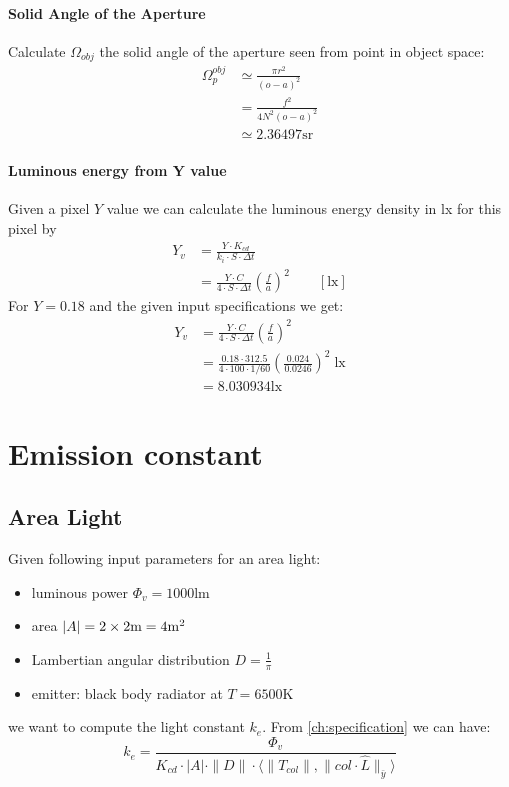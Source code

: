 \fi

\paragraph{Solid Angle of the Aperture}
Calculate $\Omega_{obj}$ the solid angle of the aperture seen from point in object space:
\begin{align*}
\Omega_p^{obj} &\simeq \frac{\pi r^2}{(o-a)^2}\\
&= \frac{f^2}{4N^2(o-a)^2}\\
&\simeq  \num{2.36497}\unit{\steradian}
\end{align*}

\paragraph{Luminous energy from Y value}

Given a pixel $Y$ value we can calculate the luminous energy density in \unit{\lux} for this pixel by
\begin{align*}
Y_v &= \frac{Y\cdot K_{cd}}{ k_i\cdot S \cdot \Delta t} \\
&= \frac{Y\cdot C}{ 4\cdot S \cdot \Delta t} \left(\frac{f}{a}\right)^2
\qquad [\unit{\lux}]
\end{align*}
For $Y=0.18$ and the given input specifications we get:
\begin{align*}
Y_v &= \frac{Y\cdot C}{ 4\cdot S \cdot \Delta t} \left(\frac{f}{a}\right)^2 \\
&= \frac{0.18\cdot 312.5}{ 4\cdot 100 \cdot 1/60} \left(\frac{0.024}{0.0246}\right)^2 \;\unit{\lux} \\
&= \num{8.030934}\unit{\lux}
\end{align*}

\section{Emission constant}

\subsection{Area Light}
Given following input parameters for an area light:
\begin{itemize}
\item luminous power $\Phi_v=\num{1000}\unit{\lumen}$
\item area $|A|= \numproduct{2 x 2}\unit{\meter} = \num{4}\unit{\square\meter}$
\item Lambertian angular distribution $D = \frac1{\pi}$
\item emitter: black body radiator at $T=\num{6500}\unit{\kelvin}$
\end{itemize}
we want to compute the light constant $k_e$. From \cref{ch:specification} we can  have:
\begin{displaymath}
 k_e = \frac{\Phi_v}{K_{cd} \cdot |A| \cdot \|D\| \cdot \langle \|T_{col}\|, \|col\cdot\hat{L}\|_{\bar y} \rangle }
\end{displaymath}


